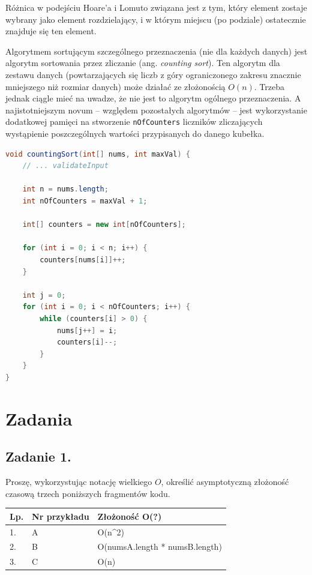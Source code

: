 \documentclass[twoside]{article}
\begin{document}
Różnica w podejściu Hoare'a i Lomuto związana jest z tym, który element zostaje wybrany jako element rozdzielający, 
i w którym miejscu (po podziale) ostatecznie znajduje się ten element.

Algorytmem sortującym szczególnego przeznaczenia (nie dla każdych danych) jest algorytm sortowania przez zliczanie
(ang. \textit{counting sort}). Ten algorytm dla zestawu danych (powtarzających się liczb z góry ograniczonego zakresu znacznie mniejszego niż rozmiar danych) może działać ze złożonością $O(n)$. Trzeba jednak ciągle mieć na uwadze, że
nie jest to algorytm ogólnego przeznaczenia.
A najistotniejszym novum -- względem pozostałych algorytmów -- jest wykorzystanie dodatkowej pamięci na stworzenie \verb|nOfCounters| liczników zliczających wystąpienie poszczególnych wartości przypisanych do danego kubełka.

\begin{lstlisting}[caption={Counting sort}, frame=tblr, language=Java, label={lst:counting_sort}]
void countingSort(int[] nums, int maxVal) {
    // ... validateInput

    int n = nums.length;
    int nOfCounters = maxVal + 1;

    int[] counters = new int[nOfCounters];

    for (int i = 0; i < n; i++) {
        counters[nums[i]]++;
    }

    int j = 0;
    for (int i = 0; i < nOfCounters; i++) {
        while (counters[i] > 0) {
            nums[j++] = i;
            counters[i]--;
        }
    }
}
\end{lstlisting}

\section{Zadania}

\subsection{Zadanie 1.}
Proszę, wykorzystując notację wielkiego $O$, określić asymptotyczną złożoność czasową trzech poniższych fragmentów kodu.

\begin{table}[h]
\begin{tabular}{|l|l|l|}
\hline
Lp. & Nr przykładu & Złożoność O(?) \\ \hline
1.  & A            & O(n^2)               \\ \hline
2.  & B            & O(numsA.length * numsB.length)               \\ \hline
3.  & C            & O(n)               \\ \hline
\end{tabular}
\end{table}
\end{document}
